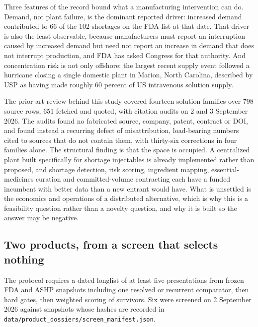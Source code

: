 Three features of the record bound what a manufacturing intervention can do. Demand, not plant
failure, is the dominant reported driver: increased demand contributed to 66 of the 102
shortages on the FDA list at that date. That driver is also the least observable, because
manufacturers must report an interruption caused by increased demand but need not report an
increase in demand that does not interrupt production, and FDA has asked Congress for that
authority. And concentration risk is not only offshore: the largest recent supply event
followed a hurricane closing a single domestic plant in Marion, North Carolina, described by
USP as having made roughly 60 percent of US intravenous solution supply.

The prior-art review behind this study covered fourteen solution families over 798 source rows,
651 fetched and quoted, with citation audits on 2 and 3 September 2026. The audits found no
fabricated source, company, patent, contract or DOI, and found instead a recurring defect of
misattribution, load-bearing numbers cited to sources that do not contain them, with thirty-six
corrections in four families alone. The structural finding is that the space is occupied. A
centralized plant built specifically for shortage injectables is already implemented rather
than proposed, and shortage detection, risk scoring, ingredient mapping, essential-medicines
curation and committed-volume contracting each have a funded incumbent with better data than a
new entrant would have. What is unsettled is the economics and operations of a distributed
alternative, which is why this is a feasibility question rather than a novelty question, and
why it is built so the answer may be negative.

\subsection{Two products, from a screen that selects nothing}
\label{sec:products}

The protocol requires a dated longlist of at least five presentations from frozen FDA and ASHP
snapshots including one resolved or recurrent comparator, then hard gates, then weighted
scoring of survivors. Six were screened on 2 September 2026 against snapshots whose hashes are
recorded in \texttt{data/product\_dossiers/screen\_manifest.json}.

